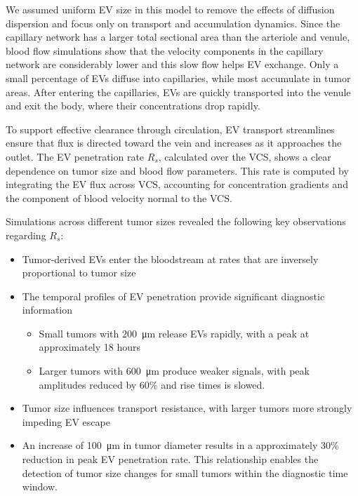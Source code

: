 \documentclass[sigconf]{acmart}
\begin{document}
We assumed uniform EV size in this model to remove the effects of diffusion dispersion and focus only on transport and accumulation dynamics. Since the capillary network has a larger total sectional area than the arteriole and venule, blood flow simulations show that the velocity components in the capillary network are considerably lower and this slow flow helps EV exchange. Only a small percentage of EVs diffuse into capillaries, while most accumulate in tumor areas. After entering the capillaries, EVs are quickly transported into the venule and exit the body, where their concentrations drop rapidly. 

To support effective clearance through circulation, EV transport streamlines ensure that flux is directed toward the vein and increases as it approaches the outlet. The EV penetration rate \( R_s \), calculated over the VCS, shows a clear dependence on tumor size and blood flow parameters. This rate is computed by integrating the EV flux across VCS, accounting for concentration gradients and the component of blood velocity normal to the VCS.

Simulations across different tumor sizes revealed the following key observations regarding $R_s$:
\begin{itemize}
    \item Tumor-derived EVs enter the bloodstream at rates that are inversely proportional to tumor size

    \item The temporal profiles of EV penetration provide significant diagnostic information
    \begin{itemize}
        \item Small tumors with 200~\si{\micro\meter} release EVs rapidly, with a peak at approximately 18 hours
        \item Larger tumors with 600~\si{\micro\meter} produce weaker signals, with peak amplitudes reduced by 60\% and rise times is slowed.
    \end{itemize}
    
    \item Tumor size influences transport resistance, with larger tumors more strongly impeding EV escape

    \item An increase of 100~\si{\micro\meter} in tumor diameter results in a approximately 30\% reduction in peak EV penetration rate. This relationship enables the detection of tumor size changes for small tumors within the diagnostic time window.
\end{itemize}
\end{document}
